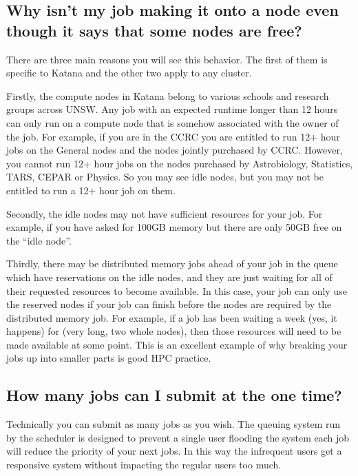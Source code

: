 \documentclass[letterpaper,10pt,english]{sphinxmanual}
\begin{document}
\subsection{Why isn’t my job making it onto a node even though it says that some nodes are free?}
\label{\detokenize{faq:why-isn-t-my-job-making-it-onto-a-node-even-though-it-says-that-some-nodes-are-free}}
There are three main reasons you will see this behavior. The first of them is specific to Katana and the other two apply to any cluster.

Firstly, the compute nodes in Katana belong to various schools and research groups across UNSW. Any job with an expected run\sphinxhyphen{}time longer than 12 hours can only run on a compute node that is somehow associated with the owner of the job. For example, if you are in the CCRC you are entitled to run 12+ hour jobs on the General nodes and the nodes jointly purchased by CCRC. However, you cannot run 12+ hour jobs on the nodes purchased by Astrobiology, Statistics, TARS, CEPAR or Physics. So you may see idle nodes, but you may not be entitled to run a 12+ hour job on them.

Secondly, the idle nodes may not have sufficient resources for your job. For example, if you have asked for 100GB memory but there are only 50GB free on the “idle node”.

Thirdly, there may be distributed memory jobs ahead of your job in the queue which have reservations on the idle nodes, and they are just waiting for all of their requested resources to become available. In this case, your job can only use the reserved nodes if your job can finish before the nodes are required by the distributed memory job. For example, if a job has been waiting a week (yes, it happens) for  (very long, two whole nodes), then those resources will need to be made available at some point. This is an excellent example of why breaking your jobs up into smaller parts is good HPC practice.


\subsection{How many jobs can I submit at the one time?}
\label{\detokenize{faq:how-many-jobs-can-i-submit-at-the-one-time}}
Technically you can submit as many jobs as you wish. The queuing system run by the scheduler is designed to prevent a single user flooding the system \sphinxhyphen{} each job will reduce the priority of your next jobs. In this way the infrequent users get a responsive system without impacting the regular users too much.
\end{document}
